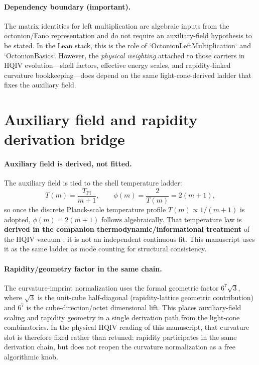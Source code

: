 \documentclass[11pt,a4paper]{article}
\theoremstyle{remark}
\begin{document}
\paragraph{Dependency boundary (important).}
The matrix identities for left multiplication are algebraic inputs from the octonion/Fano representation and do not require an auxiliary-field hypothesis to be stated. In the Lean stack, this is the role of `OctonionLeftMultiplication` and `OctonionBasics`. However, the \emph{physical weighting} attached to those carriers in HQIV evolution---shell factors, effective energy scales, and rapidity-linked curvature bookkeeping---does depend on the same light-cone-derived ladder that fixes the auxiliary field.

\section{Auxiliary field and rapidity derivation bridge}

\paragraph{Auxiliary field is derived, not fitted.}
The auxiliary field is tied to the shell temperature ladder:
\[
  T(m)=\frac{T_{\mathrm{Pl}}}{m+1},\qquad
  \phi(m)=\frac{2}{T(m)}=2(m+1),
\]
so once the discrete Planck-scale temperature profile $T(m)\propto 1/(m+1)$ is adopted, $\phi(m)=2(m+1)$ follows algebraically. That temperature law is \textbf{derived in the companion thermodynamic/informational treatment} of the HQIV vacuum \cite{ettinger2026hqiv}; it is not an independent continuous fit. This manuscript uses it as the same ladder as mode counting for structural consistency.

\paragraph{Rapidity/geometry factor in the same chain.}
The curvature-imprint normalization uses the formal geometric factor $6^7\sqrt{3}$, where $\sqrt{3}$ is the unit-cube half-diagonal (rapidity-lattice geometric contribution) and $6^7$ is the cube-direction/octet dimensional lift. This places auxiliary-field scaling and rapidity geometry in a single derivation path from the light-cone combinatorics. In the physical HQIV reading of this manuscript, that curvature slot is therefore fixed rather than retuned: rapidity participates in the same derivation chain, but does not reopen the curvature normalization as a free algorithmic knob.
\end{document}
